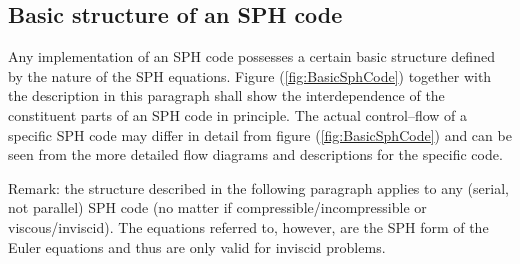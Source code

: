 \documentclass{report}
\begin{document}
\subsection{Basic structure of an SPH code}

Any implementation of an SPH code possesses a certain basic structure defined by the 
nature of the SPH equations. Figure (\ref{fig:BasicSphCode}) together with the description in this paragraph shall show the interdependence of the 
constituent parts of an SPH code in principle. The actual control--flow of a specific
SPH code may differ in detail from figure (\ref{fig:BasicSphCode}) and can be seen 
from the more detailed flow diagrams and descriptions for the specific code.

Remark: the structure described in the following paragraph applies to any (serial, not parallel) SPH code (no matter if compressible/incompressible or viscous/inviscid). The equations referred to, however, are the SPH form of the Euler equations and thus are only valid for inviscid problems.
\end{document}
